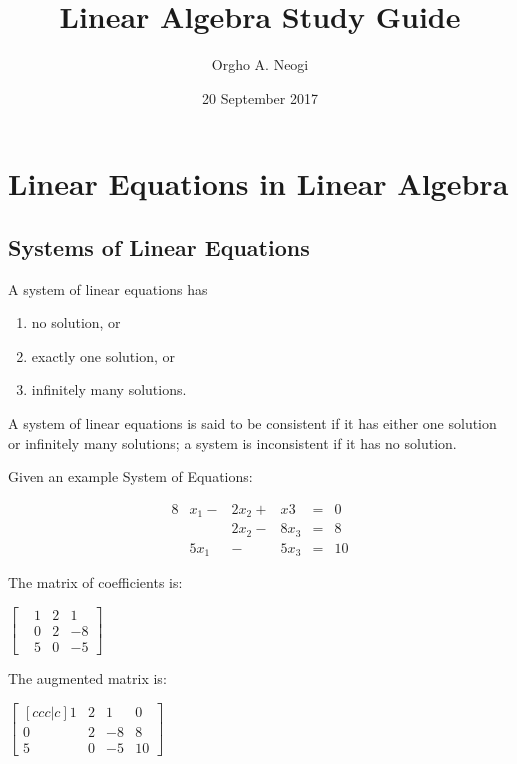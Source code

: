 \documentclass[oneside]{report}
\title{Linear Algebra Study Guide}
\author{Orgho A. Neogi}
\date{20 September 2017}
\begin{document}
\maketitle

\chapter{Linear Equations in Linear Algebra}


\section{Systems of Linear Equations}

A system of linear equations has

\begin{enumerate}
  \item no solution, or
  \item exactly one solution, or
  \item infinitely many solutions.
\end{enumerate}

A system of linear equations is said to be consistent if it has either one solution or
infinitely many solutions; a system is inconsistent if it has no solution.

Given an example System of Equations:

\begin{alignat*}{8}
  &x_1 - &2x_2 + &x3  &= &0 \\
  &     &2x_2 - &8x_3 &= &8 \\
  &5x_1 &     - &5x_3 &= &10
\end{alignat*}

The matrix of coefficients is:

\begin{center}
$\begin{bmatrix}
  &1 &2 &1\\
  &0 &2 &-8\\
  &5 &0 &-5
\end{bmatrix}$
\end{center}

The augmented matrix is:
\begin{center}
  $\begin{bmatrix}[ccc|c]
    1 &2 &1  &0\\
    0 &2 &-8 &8\\
    5 &0 &-5 &10
  \end{bmatrix}$
\end{center}
\end{document}

